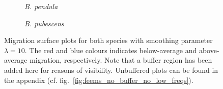 \documentclass[hidelinks,11pt]{article}
\newcommand{\pendula}{\textit{B. pendula}}
\newcommand{\pubescens}{\textit{B. pubescens}}
\begin{document}
{    \begin{figure}[ht]
        \centering
        \begin{subfigure}[b]{0.47\textwidth}
            \centering
            \caption{\pendula{}}
            \label{fig:feems_no_very_low_freqs_pendula_lambda_10}
        \end{subfigure}
        \hfill
        \begin{subfigure}[b]{0.47\textwidth}
            \centering
            \caption{\pubescens{}}
            \label{fig:feems_no_very_low_freqs_pubescens_lambda_10}
        \end{subfigure}
        \caption{Migration surface plots for both species with smoothing parameter $\lambda = 10$. The red and blue colours indicates below-average and above-average migration, respectively. Note that a buffer region has been added here for reasons of visibility. Unbuffered plots can be found in the appendix (cf. fig.~\ref{fig:feems_no_buffer_no_low_freqs}).}
        \label{fig:feems_no_very_low_freqs_lambda_10}
    \end{figure}

}
\end{document}
